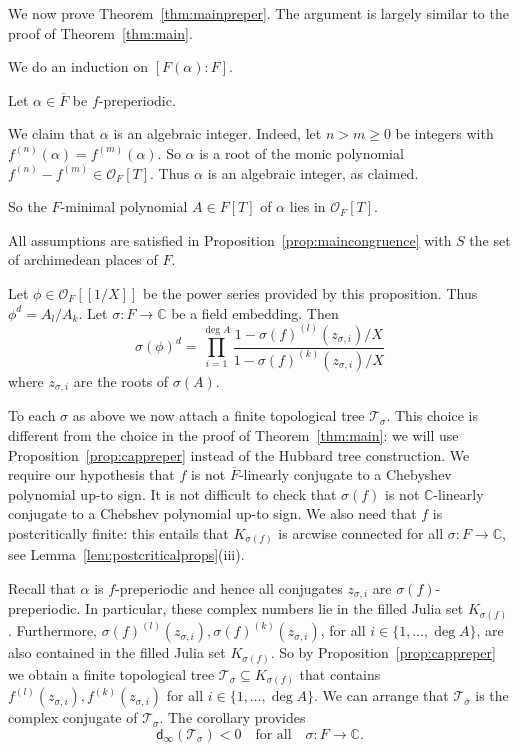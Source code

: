 \documentclass[12pt,oneside,a4]{amsart}
\newcommand{\IC}{\mathbb{C}}
\newcommand{\cT}{\mathcal{T}}
\newcommand{\cO}{\mathcal{O}}
\numberwithin{maincounter}{section}
\numberwithin{equation}{section}
\renewcommand{\subset}{\subseteq}
\begin{document}
We now prove Theorem~\ref{thm:mainpreper}. 
The argument is largely similar to the proof of Theorem~\ref{thm:main}.

We do an induction on $[F(\alpha):F]$.

Let $\alpha\in \overline F$ be $f$-preperiodic.

We claim that $\alpha$ is an algebraic integer. Indeed, 
let $n>m\ge 0$
be integers with $f^{(n)}(\alpha) = f^{(m)}(\alpha)$. So $\alpha$ is a
root of the monic polynomial $f^{(n)}-f^{(m)}\in \cO_F[T]$. Thus
$\alpha$ is an algebraic integer, as claimed.

So the $F$-minimal polynomial $A\in F[T]$ of $\alpha$ lies in
$\cO_F[T]$. 

All assumptions are satisfied in
Proposition~\ref{prop:maincongruence} with $S$ the set of archimedean
places of $F$.

Let 
$\phi\in \cO_F[[1/X]]$
be the power series provided by this proposition. 
Thus $\phi^d =A_l/A_k$.  
Let $\sigma\colon F\rightarrow\IC$ be a field embedding. Then
\begin{equation*}
  \sigma(\phi)^d = 
  \prod_{i=1}^{\deg A} \frac{1- \sigma(f)^{(l)}(z_{\sigma,i})/X}{1- \sigma(f)^{(k)}(z_{\sigma,i})/X}
\end{equation*}
where $z_{\sigma,i}$ are the roots of $\sigma(A)$. 

To each $\sigma$ as above we now attach a finite topological tree
$\cT_\sigma$. This choice is different from the choice in the proof of
Theorem~\ref{thm:main}:  we will use Proposition~\ref{prop:cappreper}
instead of the Hubbard tree construction.
We require our hypothesis  that $f$ is not $\overline F$-linearly
conjugate to a Chebyshev polynomial up-to sign.
It is not difficult to check that  $\sigma(f)$ is not $\IC$-linearly conjugate to a Chebshev
polynomial up-to sign.
We  also need that
$f$ is postcritically finite: this entails that $K_{\sigma(f)}$ is
arcwise connected for all $\sigma\colon F\rightarrow\IC$, see
Lemma~\ref{lem:postcriticalprops}(iii). 


Recall that $\alpha$ is $f$-preperiodic and hence all
conjugates $z_{\sigma,i}$ are $\sigma(f)$-preperiodic. In particular,
these complex numbers lie in the filled Julia set $K_{\sigma(f)}$.
Furthermore, 
$\sigma(f)^{(l)}(z_{\sigma,i}),
\sigma(f)^{(k)}(z_{\sigma,i})$,
for all $i\in \{1,\ldots,\deg A\}$, are also contained in the filled Julia
set $K_{\sigma(f)}$.
So by Proposition~\ref{prop:cappreper} we obtain a
finite topological tree $\cT_\sigma \subset
K_{\sigma(f)}$ that contains $f^{(l)}(z_{\sigma,i}),
f^{(k)}(z_{\sigma,i})$
for all $i\in \{1,\ldots,\deg A\}$. 
We can arrange that $\cT_{\overline \sigma}$ is
the complex conjugate of $\cT_\sigma$. 
The corollary provides
\begin{equation}
  \label{eq:trandianegative}
  \mathsf{d}_\infty(\cT_\sigma)<0
  \quad\text{for all}
  \quad \sigma\colon
  F\rightarrow \IC.
\end{equation}
\end{document}
